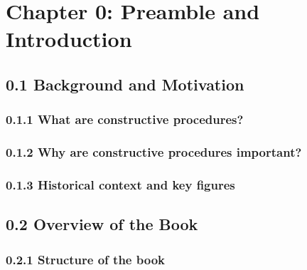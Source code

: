\hypertarget{chapter-0-preamble-and-introduction}{%
\section*{Chapter 0: Preamble and
Introduction}\label{chapter-0-preamble-and-introduction}}

\hypertarget{background-and-motivation}{%
\subsection*{0.1 Background and
Motivation}\label{background-and-motivation}}

\hypertarget{what-are-constructive-procedures}{%
\subsubsection*{0.1.1 What are constructive
procedures?}\label{what-are-constructive-procedures}}

\hypertarget{why-are-constructive-procedures-important}{%
\subsubsection*{0.1.2 Why are constructive procedures
important?}\label{why-are-constructive-procedures-important}}

\hypertarget{historical-context-and-key-figures}{%
\subsubsection*{0.1.3 Historical context and key
figures}\label{historical-context-and-key-figures}}

\hypertarget{overview-of-the-book}{%
\subsection*{0.2 Overview of the Book}\label{overview-of-the-book}}

\hypertarget{structure-of-the-book}{%
\subsubsection*{0.2.1 Structure of the
book}\label{structure-of-the-book}}

